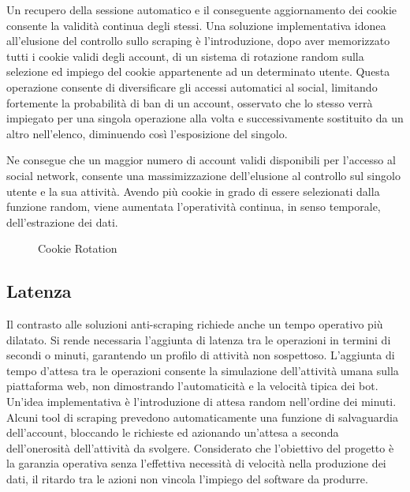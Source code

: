 Un recupero della sessione automatico e il conseguente aggiornamento dei cookie consente la validit\`a continua degli stessi.
Una soluzione implementativa idonea all'elusione del controllo sullo scraping \`e l'introduzione, dopo aver memorizzato tutti i cookie validi degli account, di un sistema di rotazione random sulla selezione ed impiego del cookie appartenente ad un determinato utente.
Questa operazione consente di diversificare gli accessi automatici al social, limitando fortemente la probabilit\`a di ban di un account, osservato che lo stesso verr\`a impiegato per una singola operazione alla volta e successivamente sostituito da un altro nell'elenco, diminuendo cos\`i l'esposizione del singolo.

Ne consegue che un maggior numero di account validi disponibili per l'accesso al social network, consente una massimizzazione dell'elusione al controllo sul singolo utente e la sua attivit\`a.
Avendo pi\`u cookie in grado di essere selezionati dalla funzione random, viene aumentata l'operativit\`a continua, in senso temporale, dell'estrazione dei dati.  

\begin{figure}[!htb]
  \begin{center}
  
  \caption{Cookie Rotation}
\end{center}
\end{figure}
\newpage

\subsection{Latenza}
Il contrasto alle soluzioni anti-scraping richiede anche un tempo operativo pi\`u dilatato. Si rende necessaria l'aggiunta di latenza tra le operazioni in termini di secondi o minuti, garantendo un profilo di attivit\`a non sospettoso.
L'aggiunta di tempo d'attesa tra le operazioni consente la simulazione dell'attivit\`a umana sulla piattaforma web, non dimostrando l'automaticit\`a e la velocit\`a tipica dei bot.
Un'idea implementativa \`e l'introduzione di attesa random nell'ordine dei minuti. Alcuni tool di scraping prevedono automaticamente una funzione di salvaguardia dell'account, bloccando le richieste ed azionando un'attesa a seconda dell'onerosit\`a dell'attivit\`a da svolgere.
Considerato che l'obiettivo del progetto \`e la garanzia operativa senza l'effettiva necessit\`a di velocit\`a nella produzione dei dati, il ritardo tra le azioni non vincola l'impiego del software da produrre.

